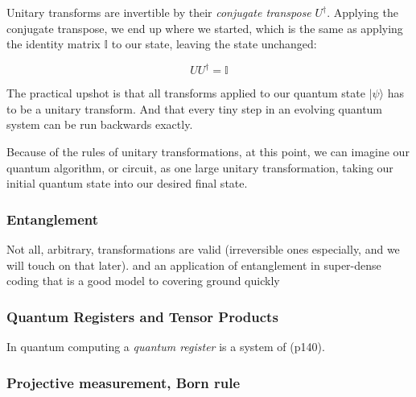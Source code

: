 Unitary transforms are invertible by their \emph{conjugate transpose} $U^\dag$.  
Applying the conjugate transpose, we end up where we started, 
which is the same as applying the identity matrix $\mathbb{I}$ to our state, leaving the state unchanged:

$$UU^\dag = \mathbb{I}$$

The practical upshot is that all transforms applied to our quantum state $|\psi\rangle$ has to be a unitary transform.
And that every tiny step in an evolving quantum system can be run backwards exactly.

Because of the rules of unitary transformations, at this point, we can imagine our quantum algorithm, or circuit, 
as one large unitary transformation, taking our initial quantum state into our desired final state.


\subsubsection{Entanglement}

Not all, arbitrary, transformations are valid (irreversible ones especially, and we will touch on that later).
and an application of entanglement in super-dense coding that is a good model to covering ground quickly \cite{Nielsen:2010}


\subsubsection{Quantum Registers and Tensor Products}

In quantum computing a \emph{quantum register} is a system of  \cite{Lipton:2021} (p140).


\subsubsection{Projective measurement, Born rule}


